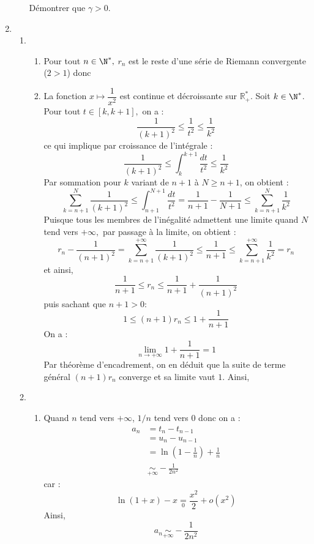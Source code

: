 \documentclass[a4paper,twoside,french,10pt]{VcCours}
\begin{document}
\begin{enumerate}
\begin{enumerate}
        
        Démontrer que $\gamma>0.$
        
        
        
    \end{enumerate}
        
        
        
        \item
        
        
        \begin{enumerate}
        
        \item 
        
        
        \begin{enumerate}
        
        \item Pour tout $n\in\N^*,$ $r_n$ est le reste d'une série de Riemann convergente ($2>1$) donc 
        
        
        \item La fonction $x \mapsto \dfrac{1}{x^2}$ est continue et décroissante sur $\mathbb{R}_+^*$. Soit $k\in\N^*$. Pour tout $t\in[k,k+1],$ on a :
        $$\frac{1}{(k+1)^2}\leq\frac{1}{t^2}\leq \frac{1}{k^2}$$
    ce qui implique par croissance de l'intégrale :
        $$\frac{1}{(k+1)^2}\leq \int_k^{k+1}\frac{dt}{t^2}\leq \frac{1}{k^2}$$
    Par sommation pour $k$ variant de $n+1$ à $N \geq n+1$, on obtient :
    $$\sum_{k=n+1}^N \frac{1}{(k+1)^2}\leq \int_{n+1}^{N+1}\frac{dt}{t^2}=\frac{1}{n+1}-\frac{1}{N+1}\leq \sum_{k=n+1}^N \frac{1}{k^2}$$
    Puisque tous les membres de l'inégalité admettent une limite quand $N$ tend vers $+\infty,$ par passage \`a la limite, on obtient :
        $$r_n-\frac{1}{(n+1)^2}=\sum_{k=n+1}^{+\infty} \frac{1}{(k+1)^2}\leq \frac{1}{n+1} \leq \sum_{k=n+1}^{+\infty} \frac{1}{k^2}=r_n$$
    et ainsi,
    $$\frac{1}{n+1}  \leq r_n\leq \frac{1}{n+1} +\frac{1}{(n+1)^2}$$
    puis sachant que $n+1>0$:
    $$ 1 \leq (n+1) r_n  \leq 1 + \dfrac{1}{n+1}$$
    On a :
    $$ \lim_{n \rightarrow + \infty} 1 + \dfrac{1}{n+1} = 1$$
    Par théorème d'encadrement, on en déduit que la suite de terme général $(n+1)r_n$ converge et sa limite vaut $1$. Ainsi,
        \end{enumerate} 
        
            \item 
            \begin{enumerate}
                \item Quand $n$ tend vers $+ \infty$, $1/n$ tend vers $0$ donc on a :
    \begin{align*} 
    a_n& =t_n-t_{n-1} \\
    &=u_n-u_{n-1} \\
    & =\ln\left(1-\frac{1}{n}\right)+\frac{1}{n}\\
    &\mathop{\sim}\limits_{+\infty}-\frac{1}{2n^2}
    \end{align*}
    car :
    $$\ln(1+x)-x \underset{0}{=} \dfrac{x^2}{2} + o(x^2)$$
    Ainsi,
    $$ \boxed{a_n \mathop{\sim}\limits_{+\infty}-\frac{1}{2n^2}}$$
                

\end{enumerate}
\end{enumerate}
\end{enumerate}
\end{document}
